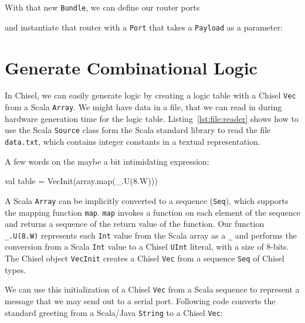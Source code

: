 \documentclass[%
    10pt,
    headinclude, footexclude,
    openright, %
    notitlepage,
    cleardoubleempty,
    headsepline,
    pointlessnumbers,
    bibtotoc, idxtotoc,
    ]{scrbook}
\newcommand{\code}[1]{{\small{\texttt{#1}}}}
\begin{document}

\noindent With that new \code{Bundle}, we can define our router ports


\noindent and instantiate that router with a \code{Port} that takes
a \code{Payload} as a parameter:



\section{Generate Combinational Logic}
\label{sec:gen:comb:logic}

In Chisel, we can easily generate logic by creating a logic table with
a Chisel \code{Vec} from a Scala \code{Array}.
We might have data in a file, that we can read in during hardware generation
time for the logic table.
Listing~\ref{lst:file:reader} shows how to use the Scala \code{Source}
class form the Scala standard library to read the file \code{data.txt}, which
contains integer constants in a textual representation.




A few words on the maybe a bit intimidating expression:
\begin{chisel}
  val table = VecInit(array.map(_.U(8.W)))
\end{chisel}

\noindent A Scala \code{Array} can be implicitly converted to a sequence (\code{Seq}),
which supports the mapping function \code{map}.
\code{map} invokes a function on each element of the sequence and returns
a sequence of the return value of the function. Our function \code{\_.U(8.W)} represents
each \code{Int} value from the Scala array as a \code{\_} and performs the conversion
from a Scala \code{Int} value to a Chisel \code{UInt} literal, with a size of 8-bits.
The Chisel object \code{VecInit} creates a Chisel \code{Vec} from a sequence \code{Seq}
of Chisel types.

We can use this initialization of a Chisel \code{Vec} from a Scala sequence to represent
a message that we may send out to a serial port. Following code converts the standard greeting
from a Scala/Java \code{String} to a Chisel \code{Vec}:
\end{document}
